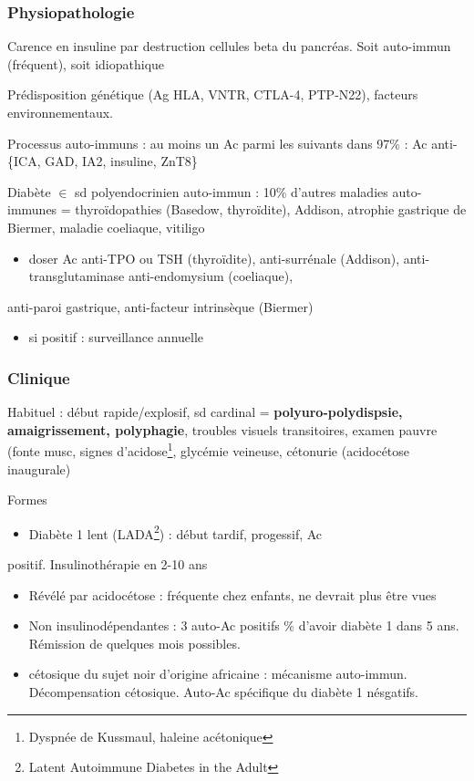 \documentclass[11pt]{article}
\begin{document}
\subsubsection{Physiopathologie}
\label{sec:orgb7fd26a}
Carence en insuline par destruction cellules beta du pancréas. Soit auto-immun
(fréquent), soit idiopathique

Prédisposition génétique (Ag HLA, VNTR, CTLA-4, PTP-N22), facteurs
environnementaux.

Processus auto-immuns : au moins un Ac parmi les suivants dans 97\% : Ac
anti-\{ICA, GAD, IA2, insuline, ZnT8\}

Diabète \(\in\) sd polyendocrinien auto-immun : 10\% d'autres maladies auto-immunes =
thyroïdopathies (Basedow, thyroïdite), Addison, atrophie gastrique de Biermer,
maladie coeliaque, vitiligo 
\begin{itemize}
\item \thus doser Ac anti-TPO ou TSH (thyroïdite), anti-surrénale (Addison), anti-transglutaminase \textpm{} anti-endomysium (coeliaque),
\end{itemize}
anti-paroi gastrique, anti-facteur intrinsèque (Biermer)
\begin{itemize}
\item si positif : surveillance annuelle
\end{itemize}

\subsubsection{Clinique}
\label{sec:org32dfe92}
Habituel : début rapide/explosif, sd cardinal = \textbf{polyuro-polydispsie,
amaigrissement, polyphagie}, troubles visuels transitoires, examen pauvre (fonte
musc, signes d'acidose\footnote{Dyspnée de Kussmaul, haleine acétonique}, glycémie veineuse, cétonurie (acidocétose
inaugurale)

Formes
\begin{itemize}
\item Diabète 1 lent (LADA\footnote{Latent Autoimmune Diabetes in the Adult}) : début tardif, progessif, Ac
\end{itemize}
positif. Insulinothérapie en 2-10 ans
\begin{itemize}
\item Révélé par acidocétose : fréquente chez enfants, ne devrait plus être vues
\item Non insulinodépendantes : 3 auto-Ac positifs \% d'avoir diabète 1 dans
5 ans. Rémission de quelques mois possibles.
\item cétosique du sujet noir d'origine africaine : mécanisme
auto-immun. Décompensation cétosique. Auto-Ac spécifique du diabète 1
nésgatifs.
\end{itemize}
\end{document}
